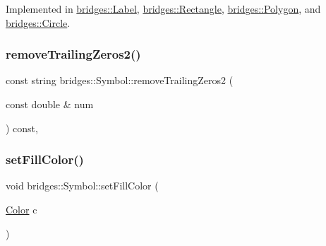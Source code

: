 Implemented in \mbox{\hyperlink{classbridges_1_1_label_af4bdf9e492cf2a2bf3a8be42bd282b44}{bridges\+::\+Label}}, \mbox{\hyperlink{classbridges_1_1_rectangle_a509c9489c6f145b684447851736acac5}{bridges\+::\+Rectangle}}, \mbox{\hyperlink{classbridges_1_1_polygon_a5c3e3bbeda23db712088278a3c82a0a6}{bridges\+::\+Polygon}}, and \mbox{\hyperlink{classbridges_1_1_circle_aaee59a0d8ad00c75f7547bac2cfabd38}{bridges\+::\+Circle}}.

\mbox{\label{classbridges_1_1_symbol_aafd36d8f24b250ccf3003f5b7b73d717}} 
\subsubsection{\texorpdfstring{remove\+Trailing\+Zeros2()}{removeTrailingZeros2()}}
{\footnotesize\ttfamily const string bridges\+::\+Symbol\+::remove\+Trailing\+Zeros2 (\begin{DoxyParamCaption}\item[{const double \&}]{num }\end{DoxyParamCaption}) const\hspace{0.3cm}{\ttfamily [inline]}, {\ttfamily [protected]}}

\mbox{\label{classbridges_1_1_symbol_a20315217d30c3c747b5b6da60c08c2c9}} 
\subsubsection{\texorpdfstring{set\+Fill\+Color()}{setFillColor()}}
{\footnotesize\ttfamily void bridges\+::\+Symbol\+::set\+Fill\+Color (\begin{DoxyParamCaption}\item[{\mbox{\hyperlink{classbridges_1_1_color}{Color}}}]{c }\end{DoxyParamCaption})\hspace{0.3cm}{\ttfamily [inline]}}

\mbox{\label{classbridges_1_1_symbol_afd181fe1e860542548efc4244e06f609}} 
